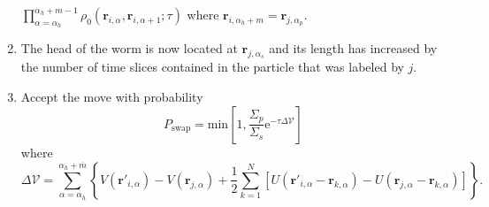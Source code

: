 \documentclass[prb,aps,amssym,nofootinbib,floatfix,notitlepage]{revtex4-1}
\renewcommand{\vec}[1]{\boldsymbol{#1}}
\newcommand{\e}[1]{\mathrm{e}^{#1}}
\begin{document}
\begin{enumerate}
    $\prod_{\alpha=\alpha_h}^{\alpha_h+m-1}
    \rho_0(\vec{r}_{i,\alpha},\vec{r}_{i,\alpha+1};\tau)$ where
    $\vec{r}_{i,\alpha_h + m} = \vec{r}_{j,\alpha_p}$.
\item The head of the worm is now located at $\vec{r}_{j,\alpha_s}$ and its
    length has increased by the number of time slices contained in the 
    particle that was labeled by $j$.
\item Accept the move with probability
\begin{equation}
    P_{\text{swap}} = \mathrm{min}\left[1,
        \frac{\Sigma_p}{\Sigma_s} \e{-\tau\Delta{\mathcal{V}}}
    \right]
\end{equation}
%
where 
\begin{equation}
    \Delta\mathcal{V} = \sum_{\alpha=\alpha_h}^{\alpha_h+\overline{m}} \left\{ 
        V(\vec{r}'_{i,\alpha}) - V(\vec{r}_{j,\alpha}) + \frac{1}{2}\sum_{k=1}^N
        \left[ U(\vec{r}'_{i,\alpha}-\vec{r}_{k,\alpha}) -
    U(\vec{r}_{j,\alpha}-\vec{r}_{k,\alpha})\right] \right\}.
\end{equation}
%
\end{enumerate}



\end{document}
